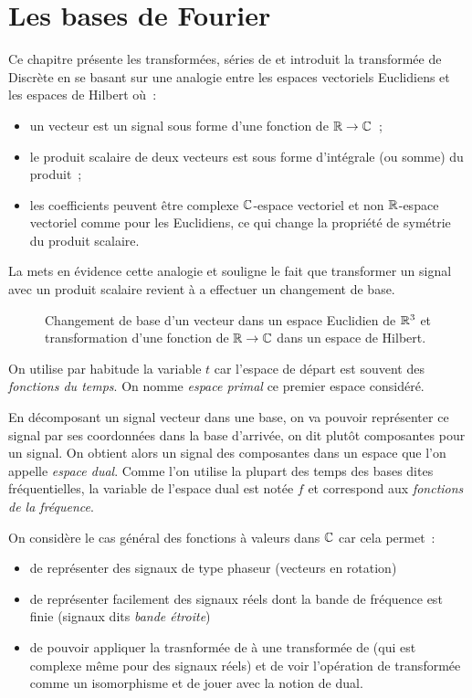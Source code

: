 \chapter{Les bases de Fourier}
\label{chap:fourier}
Ce chapitre présente les transformées, séries de \Fourier{} et introduit la transformée de\Fourier{} Discrète en se basant sur une analogie entre les espaces vectoriels Euclidiens et les espaces de Hilbert où~:
\begin{itemize}
\item un vecteur est un signal sous forme d'une fonction de $\mathbb{R}\rightarrow\mathbb{C}$~;
\item le produit scalaire de deux vecteurs est sous forme d'intégrale (ou somme) du produit~;
\item les coefficients peuvent être complexe $\mathbb{C}$-espace vectoriel et non $\mathbb{R}$-espace vectoriel comme  pour les Euclidiens, ce qui change la propriété de symétrie du produit scalaire.
\end{itemize}


La  mets en évidence cette analogie et souligne le fait que transformer un signal avec un produit scalaire revient à a effectuer un changement de base.

\begin{figure}[ht]
  \centering
  \caption{Changement de base d'un vecteur dans un espace Euclidien de $\mathbb{R}^3$ et transformation d'une fonction de $\mathbb{R}\rightarrow\mathbb{C}$ dans un espace de Hilbert. }
  \label{fig:espaces}
\end{figure}

On utilise par habitude la variable $t$ car l'espace de départ est souvent des \emph{fonctions du temps}. On nomme \emph{espace primal} ce premier espace considéré.

En décomposant un signal vecteur dans une base, on va pouvoir représenter ce signal par ses coordonnées dans la base d'arrivée, on dit plutôt composantes pour un signal. On obtient alors un \og{}signal des composantes\fg{} dans un espace que l'on appelle \emph{espace dual}. Comme l'on utilise la plupart des temps des  bases dites fréquentielles, la variable de l'espace dual est notée $f$ et correspond aux \emph{fonctions de la fréquence}.

\begin{remarque}
  On considère le cas général des fonctions à valeurs dans $\mathbb{C}$ car cela permet~:
  \begin{itemize}
  \item de représenter des signaux de type phaseur (vecteurs en rotation)
  \item de représenter facilement des signaux réels dont la bande de
    fréquence est finie (signaux dits \emph{bande étroite})
  \item de pouvoir appliquer la trasnformée de \Fourier{} à une
    transformée de \Fourier{} (qui est complexe même pour des signaux
    réels) et de voir l'opération de transformée comme un isomorphisme
    et de jouer avec la notion de dual.
    \end{itemize}
  \end{remarque}
  


